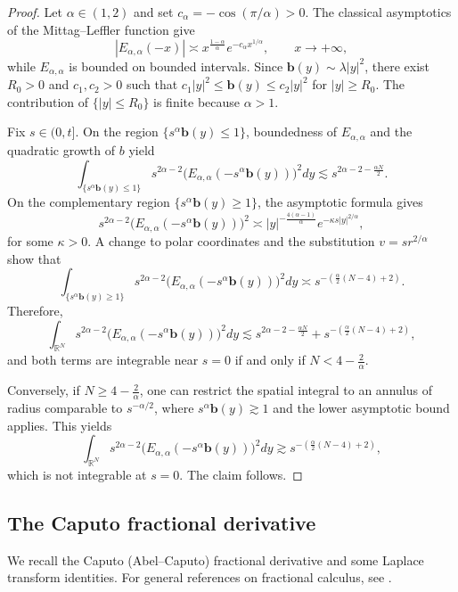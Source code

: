 \documentclass[12pt, reqno]{amsart}
\newcommand{\R}{\ensuremath{\mathbb{R}}}
\begin{document}
\begin{proof}
Let $\alpha\in(1,2)$ and set $c_\alpha=-\cos(\pi/\alpha)>0$. The classical asymptotics of the Mittag--Leffler function give
\[
|E_{\alpha,\alpha}(-x)|\asymp x^{\frac{1-\alpha}{\alpha}}e^{-c_\alpha x^{1/\alpha}},
\qquad x\to+\infty,
\]
while $E_{\alpha,\alpha}$ is bounded on bounded intervals. Since $\mathbf{b}(y)\sim\lambda|y|^2$, there exist $R_0>0$ and $c_1,c_2>0$ such that
$c_1|y|^2\le \mathbf{b}(y)\le c_2|y|^2$ for $|y|\ge R_0$. The contribution of $\{|y|\le R_0\}$ is finite because $\alpha>1$.

Fix $s\in(0,t]$. On the region $\{s^\alpha \mathbf{b}(y)\le1\}$, boundedness of $E_{\alpha,\alpha}$ and the quadratic growth of $b$ yield
\[
\int_{\{s^\alpha \mathbf{b}(y)\le1\}} s^{2\alpha-2}\bigl(E_{\alpha,\alpha}(-s^\alpha \mathbf{b}(y))\bigr)^2dy
\lesssim s^{2\alpha-2-\frac{\alpha N}{2}}.
\]
On the complementary region $\{s^\alpha \mathbf{b}(y)\ge1\}$, the asymptotic formula gives
\[
s^{2\alpha-2}\bigl(E_{\alpha,\alpha}(-s^\alpha \mathbf{b}(y))\bigr)^2
\asymp |y|^{-\frac{4(\alpha-1)}{\alpha}}
e^{-\kappa s|y|^{2/\alpha}},
\]
for some $\kappa>0$. A change to polar coordinates and the substitution
$v=s r^{2/\alpha}$ show that
\[
\int_{\{s^\alpha \mathbf{b}(y)\ge1\}} s^{2\alpha-2}
\bigl(E_{\alpha,\alpha}(-s^\alpha \mathbf{b}(y))\bigr)^2dy
\asymp s^{-\left(\frac{\alpha}{2}(N-4)+2\right)}.
\]
Therefore,
\[
\int_{\R^N} s^{2\alpha-2}\bigl(E_{\alpha,\alpha}(-s^\alpha \mathbf{b}(y))\bigr)^2dy
\lesssim
s^{2\alpha-2-\frac{\alpha N}{2}}
+
s^{-\left(\frac{\alpha}{2}(N-4)+2\right)},
\]
and both terms are integrable near $s=0$ if and only if $N<4-\frac{2}{\alpha}$.

Conversely, if $N\ge 4-\frac{2}{\alpha}$, one can restrict the spatial integral to an annulus of radius comparable to $s^{-\alpha/2}$, where $s^\alpha \mathbf{b}(y)\gtrsim1$ and the lower asymptotic bound applies. This yields
\[
\int_{\R^N} s^{2\alpha-2}\bigl(E_{\alpha,\alpha}(-s^\alpha \mathbf{b}(y))\bigr)^2dy
\gtrsim s^{-\left(\frac{\alpha}{2}(N-4)+2\right)},
\]
which is not integrable at $s=0$. The claim follows.
\end{proof}

\subsection{The Caputo fractional derivative}
We recall the Caputo (Abel--Caputo) fractional derivative and some Laplace transform identities.
For general references on fractional calculus, see \cite{KD,KST,Podlubny1999,SKM}.
\end{document}

